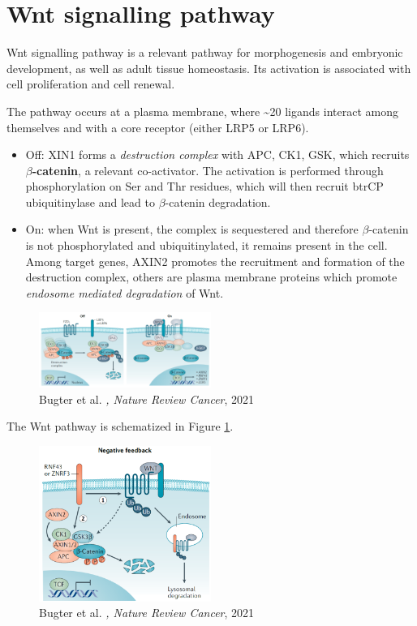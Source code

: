 \hypertarget{wnt-signalling-pathway}{%
\section{Wnt signalling pathway}\label{wnt-signalling-pathway}}

Wnt signalling pathway is a relevant pathway for morphogenesis and embryonic development, as well as adult tissue homeostasis. Its activation is associated with cell proliferation and cell renewal.

The pathway occurs at a plasma membrane, where \textasciitilde20 ligands interact among themselves and with a core receptor (either LRP5 or LRP6). 

\begin{itemize}
\tightlist
\item
  Off: XIN1 forms a \emph{destruction complex} with APC, CK1, GSK, which recruits \textbf{$\beta$-catenin}, a relevant co-activator. The activation is performed through phosphorylation on Ser and Thr residues, which will then recruit btrCP ubiquitinylase and lead to $\beta$-catenin degradation.
\item
  On: when Wnt is present, the complex is sequestered and therefore $\beta$-catenin is not phosphorylated and ubiquitinylated, it remains present in the cell. Among target genes, AXIN2 promotes the recruitment and formation of the destruction complex, others are plasma membrane proteins which promote \emph{endosome mediated degradation} of Wnt.
\end{itemize}

\begin{figure}
\centering
\includegraphics[width=0.5\textwidth]{../_resources/Screenshot_2022-10-10_at_11-03-55.png}
\caption{Bugter et al. \emph{, Nature Review Cancer}, 2021}
\label{fig:wnt}
\end{figure}

The Wnt pathway is schematized in Figure \ref{fig:wnt}.

\begin{figure}
\centering
\includegraphics[width=0.5\textwidth]{../_resources/Screenshot_2022-10-10_at_11-04-14.png}
\caption{Bugter et al. \emph{, Nature Review Cancer}, 2021}
\label{fig:negative}
\end{figure}

